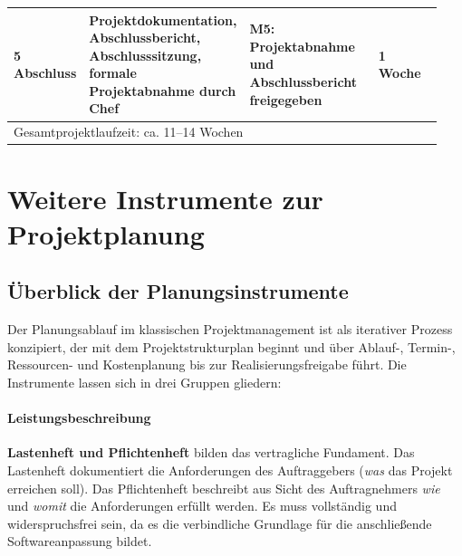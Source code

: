 \documentclass[
    a4paper,
    11pt,
    bibliography=totoc,
    listof=totoc,
    parskip=half,
    headings=normal
]{scrbook}
\begin{document}
\begin{longtable}{@{}p{0.15\linewidth}p{0.30\linewidth}p{0.32\linewidth}p{0.17\linewidth}@{}}
      \midrule
      \textbf{5 Abschluss}
                     & Projektdokumentation, Abschlussbericht, Abschlusssitzung, formale Projektabnahme durch Chef
                     & \textbf{M5}: Projektabnahme und Abschlussbericht freigegeben
                     & 1 Woche                                                                                                                                                                                                                       \\
      \bottomrule
      \multicolumn{4}{l}{\footnotesize Gesamtprojektlaufzeit: ca. 11--14 Wochen}
\end{longtable}

\section{Weitere Instrumente zur Projektplanung}

\subsection{Überblick der Planungsinstrumente}

Der Planungsablauf im klassischen Projektmanagement ist als iterativer Prozess
konzipiert, der mit dem Projektstrukturplan beginnt und über Ablauf-, Termin-,
Ressourcen- und Kostenplanung bis zur Realisierungsfreigabe führt\autocite[vgl.][Kap.~2]{Mayer2014}. Die Instrumente lassen sich in drei Gruppen
gliedern:

\paragraph{Leistungsbeschreibung}
\textbf{Lastenheft und Pflichtenheft} bilden das vertragliche Fundament. Das
Lastenheft dokumentiert die Anforderungen des Auftraggebers (\textit{was} das
Projekt erreichen soll). Das Pflichtenheft beschreibt aus Sicht des Auftragnehmers
\textit{wie} und \textit{womit} die Anforderungen erfüllt werden\autocite[vgl.][Kap.~2]{Mayer2014}. Es muss vollständig und widerspruchsfrei sein,
da es die verbindliche Grundlage für die anschließende Softwareanpassung bildet.
\end{document}
